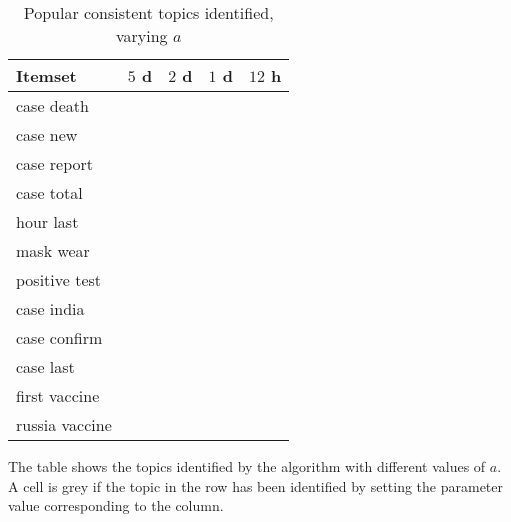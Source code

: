 
\begin{table}
    \centering
    \caption{Popular consistent topics identified, varying $a$}
    \label{tab:a}
    \begin{tabular}{>{\raggedright}p{}>{\raggedright}p{}p{}p{}p{}}
        \toprule
            Itemset
& $5$ d  & $2$ d  & $1$ d  & $12$ h   \\          
        \midrule
        case death & \checkC{} & \checkC{} & \checkC{} & \checkC{} \\
                case new & \checkC{} & \checkC{} & \checkC{} & \checkC{} \\
                case report & \checkC{} & \checkC{} & \checkC{} & \checkC{} \\
                case total & \checkC{} & \checkC{} & \checkC{} & \checkC{} \\
                hour last & \checkC{} & \checkC{} & \checkC{} & \checkC{} \\
                mask wear & \checkC{} & \checkC{} & \checkC{} & \checkC{} \\
                positive test & \checkC{} & \checkC{} & \checkC{} & \checkC{} \\
                case india & \checkC{} & \checkC{} & \checkC{} &        {} \\
                case confirm & \checkC{} &        {} & \checkC{} &        {} \\
                case last &        {} & \checkC{} & \checkC{} &        {} \\
                first vaccine & \checkC{} &        {} &        {} &        {} \\
                russia vaccine & \checkC{} &        {} &        {} &        {} \\
                
    \bottomrule
    \end{tabular}
    
        \begin{flushleft}
        The table shows the topics identified by the algorithm with different values 
        of $a$. A cell is grey if the topic in the row has been identified by setting the parameter
        value corresponding to the column.  
    \end{flushleft}
        
\end{table}

